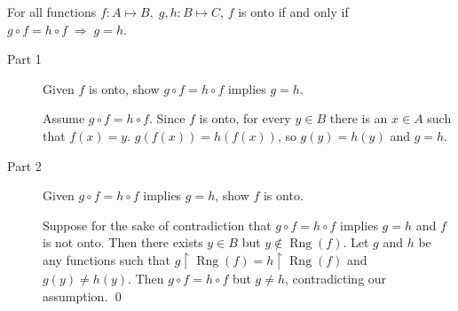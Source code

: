 \documentclass[12pt]{article}
\newcommand{\Rng}{\operatorname{Rng}}
\begin{document}
\begin{Theorem}
 For all functions $f: A \mapsto B,\; g,h: B \mapsto C$, $f$ is onto if
  and only if $g \circ f = h \circ f \; \Rightarrow \; g = h$.
\end{Theorem}

\medskip

\begin{Proof}
\begin{description}
\item[Part 1]  Given $f$ is onto, show $g \circ f = h \circ f$ 
  implies $g = h$.

Assume $g \circ f = h \circ f$.  Since $f$ is onto, for every $y \in B$
there is an $x \in A$ such that $f(x) = y$.  $g(f(x)) = h(f(x))$, so
$g(y) = h(y)$ and $g = h$.

\item[Part 2]  Given $g \circ f = h \circ f$ implies $g = h$, show $f$
  is onto.

Suppose for the sake of contradiction that $g \circ f = h \circ f$
implies $g = h$ and $f$ is not onto.  Then there exists $y \in B$ but $y
\notin \Rng(f)$.  Let $g$ and $h$ be any functions such that $g
\upharpoonright \Rng(f) = h \upharpoonright \Rng(f)$ and $g(y) \ne
h(y)$.  Then $g \circ f = h \circ f$ but $g \ne h$, contradicting our
assumption. \qed
\end{description}
\end{Proof}
\end{document}
